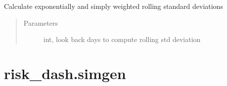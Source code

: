\documentclass[letterpaper,10pt,english]{sphinxmanual}
\begin{document}
\begin{fulllineitems}
\begin{fulllineitems}
\end{fulllineitems}


\begin{fulllineitems}
\label{\detokenize{market_data:risk_dash.market_data.QuandlStockData.set_volatility}}
\sphinxAtStartPar
Calculate exponentially and simply weighted rolling standard deviations
\begin{quote}\begin{description}
\item[{Parameters}] \leavevmode
\sphinxAtStartPar
{} \textendash{} int, look back days to compute rolling std deviation

\end{description}\end{quote}

\end{fulllineitems}


\end{fulllineitems}



\chapter{risk\_dash.simgen}
\label{\detokenize{simulation:module-risk_dash.simgen}}\label{\detokenize{simulation:risk-dash-simgen}}\label{\detokenize{simulation:simgen}}\label{\detokenize{simulation::doc}}
\end{document}
